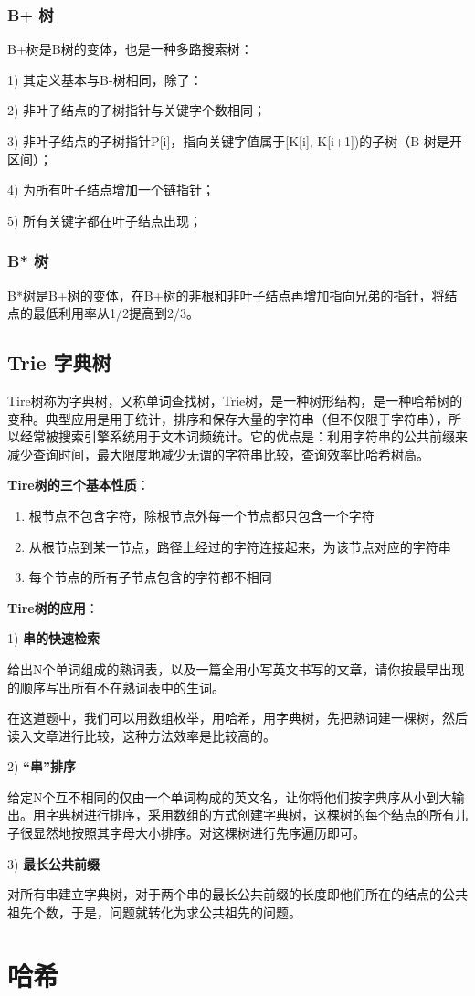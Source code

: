 \documentclass[UTF8,a4paper,12pt]{ctexbook}
\begin{document}
		\subsection{B+ 树}
			B+树是B树的变体，也是一种多路搜索树：
			
			1) 其定义基本与B-树相同，除了：
			
			2) 非叶子结点的子树指针与关键字个数相同；
			
			3) 非叶子结点的子树指针P[i]，指向关键字值属于[K[i], K[i+1])的子树（B-树是开区间）；
			
			4) 为所有叶子结点增加一个链指针；
			
			5) 所有关键字都在叶子结点出现；
			
		\subsection{B* 树}
			B*树是B+树的变体，在B+树的非根和非叶子结点再增加指向兄弟的指针，将结点的最低利用率从1/2提高到2/3。
		
			
		\section{Trie 字典树}	
			Tire树称为字典树，又称单词查找树，Trie树，是一种树形结构，是一种哈希树的变种。典型应用是用于统计，排序和保存大量的字符串（但不仅限于字符串），所以经常被搜索引擎系统用于文本词频统计。它的优点是：利用字符串的公共前缀来减少查询时间，最大限度地减少无谓的字符串比较，查询效率比哈希树高。　
			
			\textbf{Tire树的三个基本性质}：
				\begin{enumerate}[itemindent = 1em]
					\item 根节点不包含字符，除根节点外每一个节点都只包含一个字符
					\item 从根节点到某一节点，路径上经过的字符连接起来，为该节点对应的字符串
					\item 每个节点的所有子节点包含的字符都不相同
				\end{enumerate}

			\textbf{Tire树的应用}：

			1) \textbf{串的快速检索}
			
			给出N个单词组成的熟词表，以及一篇全用小写英文书写的文章，请你按最早出现的顺序写出所有不在熟词表中的生词。
			
			在这道题中，我们可以用数组枚举，用哈希，用字典树，先把熟词建一棵树，然后读入文章进行比较，这种方法效率是比较高的。
			
			2) \textbf{“串”排序}
			
			给定N个互不相同的仅由一个单词构成的英文名，让你将他们按字典序从小到大输出。用字典树进行排序，采用数组的方式创建字典树，这棵树的每个结点的所有儿子很显然地按照其字母大小排序。对这棵树进行先序遍历即可。
			
			3) \textbf{最长公共前缀}
			
			对所有串建立字典树，对于两个串的最长公共前缀的长度即他们所在的结点的公共祖先个数，于是，问题就转化为求公共祖先的问题。


\chapter{哈希}


  
		    
\end{document}
